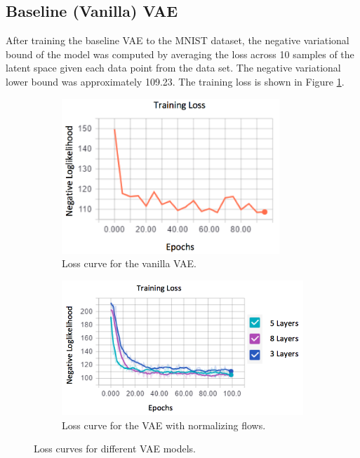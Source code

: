 \documentclass{article}
\begin{document}
\subsection{Baseline (Vanilla) VAE}
After training the baseline VAE to the MNIST dataset, the negative variational bound of the model was computed
by averaging the loss across 10 samples of the latent space given each data point from the data set. The negative variational lower bound
was approximately 109.23. The training loss is shown in Figure \ref{fig:BaselineLoss}.

\begin{figure}[htbp]\hspace{-2.5em}
\begin{subfigure}{0.5\textwidth}
\begin{center}
	\includegraphics[width=0.9\textwidth]{BaselineLoss.png}
\caption{Loss curve for the vanilla VAE.}
\label{fig:BaselineLoss}
\end{center}
\end{subfigure}
\begin{subfigure}{0.5\textwidth}
\vspace{-2.3em}
\hspace{1em}
\begin{center}
	\includegraphics[width=1.2\textwidth]{NormFlowLoss.png}
\caption{Loss curve for the VAE with normalizing flows.}
\label{fig:NormFlowLoss}
\end{center}
\end{subfigure}
\caption{Loss curves for different VAE models.}
\vspace{-1em}
\end{figure}
\end{document}
